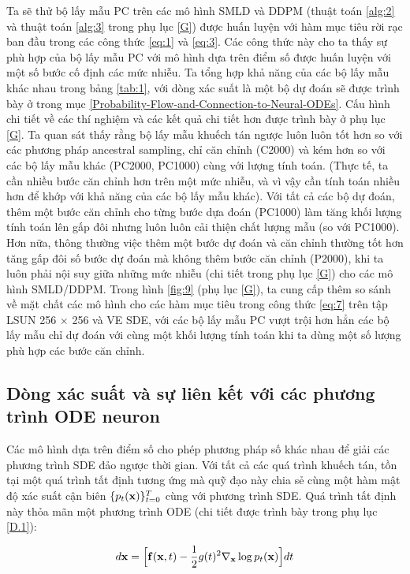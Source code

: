 \documentclass{article} %
\begin{document}
Ta sẽ thử bộ lấy mẫu PC trên các mô hình SMLD và DDPM (thuật toán \ref{alg:2} và thuật toán \ref{alg:3} trong phụ lục \ref{G}) được huấn luyện với hàm mục tiêu rời rạc ban đầu trong các công thức \ref{eq:1} và \ref{eq:3}.
Các công thức này cho ta thấy sự phù hợp của bộ lấy mẫu PC với mô hình dựa trên điểm số được huấn luyện với một số bước cố định các mức nhiễu.
Ta tổng hợp khả năng của các bộ lấy mẫu khác nhau trong bảng \ref{tab:1}, với dòng xác suất là một bộ dự đoán sẽ được trình bày ở trong mục \ref{Probability-Flow-and-Connection-to-Neural-ODEs}.
Cấu hình chi tiết về các thí nghiệm và các kết quả chi tiết hơn được trình bày ở phụ lục \ref{G}.
Ta quan sát thấy rằng bộ lấy mẫu khuếch tán ngược luôn luôn tốt hơn so với các phương pháp ancestral sampling, chỉ căn chỉnh (C2000) và kém hơn so với các bộ lấy mẫu khác (PC2000, PC1000) cùng với lượng tính toán.
(Thực tế, ta cần nhiều bước căn chỉnh hơn trên một mức nhiễu, và vì vậy cần tính toán nhiều hơn để khớp với khả năng của các bộ lấy mẫu khác).
Với tất cả các bộ dự đoán, thêm một bước căn chỉnh cho từng bước dựa đoán (PC1000) làm tăng khối lượng tính toán lên gấp đôi nhưng luôn luôn cải thiện chất lượng mẫu (so với PC1000).
Hơn nữa, thông thường việc thêm một bước dự đoán và căn chỉnh thường tốt hơn tăng gấp đôi số bước dự đoán mà không thêm bước căn chỉnh (P2000),
khi ta luôn phải nội suy giữa những mức nhiễu (chi tiết trong phụ lục \ref{G}) cho các mô hình SMLD/DDPM.
Trong hình \ref{fig:9} (phụ lục \ref{G}), ta cung cấp thêm so sánh về mặt chất các mô hình cho các hàm mục tiêu trong công thức \ref{eq:7} trên tập LSUN 256 $\times$ 256 và VE SDE, với các bộ lấy mẫu PC vượt trội hơn hẳn các bộ lấy mẫu chỉ dự đoán với cùng một khối lượng tính toán khi ta dùng một số lượng phù hợp các bước căn chỉnh.

\subsection{Dòng xác suất và sự liên kết với các phương trình ODE neuron} \label{4.3}

Các mô hình dựa trên điểm số cho phép phương pháp số khác nhau để giải các phương trình SDE đảo ngược thời gian.
Với tất cả các quá trình khuếch tán, tồn tại một quá trình tất định tương ứng mà quỹ đạo này chia sẻ cùng một hàm mật độ xác suất cận biên $\lbrace p_t (\bold{x}) \rbrace_{t=0}^T$ cùng với phương trình SDE.
Quá trình tất định này thỏa mãn một phương trình ODE (chi tiết được trình bày trong phụ lục \ref{D.1}):

\begin{equation} \label{eq:13}
    d \bold{x} = \Big \lbrack \bold{f}(\bold{x}, t) - \dfrac{1}{2}g(t)^2 \nabla_{\bold{x}} \log p_t (\bold{x}) \Big \rbrack dt
\end{equation}
\end{document}
